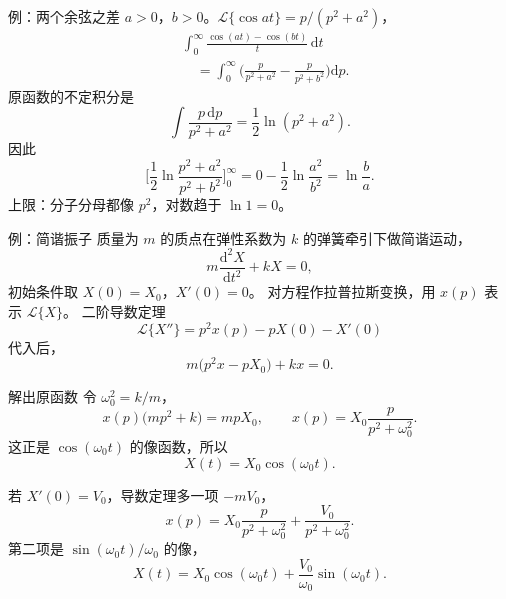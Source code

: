 \documentclass[fontset=windows, chinese, 10pt, xcolor=dvipsnames]{beamer}
\begin{document}
\begin{frame}{例：两个余弦之差}
  $a>0$，$b>0$。$\mathcal{L}\{\cos at\}=p/(p^2+a^2)$，
  \begin{align*}
    &\int_0^{\infty}\frac{\cos(at)-\cos(bt)}{t}\,\mathrm{d}t \\
    &\quad=\int_0^{\infty}
      \Biggl(\frac{p}{p^2+a^2}-\frac{p}{p^2+b^2}\Biggr)\mathrm{d}p.
  \end{align*}
  原函数的不定积分是
  \begin{equation*}
    \int\frac{p\,\mathrm{d}p}{p^2+a^2}=\frac12\ln(p^2+a^2).
  \end{equation*}
  因此
  \begin{equation*}
    \Biggl[\frac12\ln\frac{p^2+a^2}{p^2+b^2}\Biggr]_0^{\infty}
    =0-\frac12\ln\frac{a^2}{b^2}
    =\ln\frac{b}{a}.
  \end{equation*}
  上限：分子分母都像 $p^2$，对数趋于 $\ln 1=0$。
\end{frame}

\begin{frame}{例：简谐振子}
  质量为 $m$ 的质点在弹性系数为 $k$ 的弹簧牵引下做简谐运动，
  \begin{equation*}
    m\frac{\mathrm{d}^2 X}{\mathrm{d}t^2}+k X=0,
  \end{equation*}
  初始条件取 $X(0)=X_0$，$X'(0)=0$。
  对方程作拉普拉斯变换，用 $x(p)$ 表示 $\mathcal{L}\{X\}$。
  二阶导数定理
  \begin{equation*}
    \mathcal{L}\{X''\}=p^2 x(p)-p X(0)-X'(0)
  \end{equation*}
  代入后，
  \begin{equation*}
    m\bigl(p^2 x-p X_0\bigr)+k x=0.
  \end{equation*}
\end{frame}

\begin{frame}{解出原函数}
  令 $\omega_0^2=k/m$，
  \begin{equation*}
    x(p)\bigl(mp^2+k\bigr)=mp X_0,
    \qquad
    x(p)=X_0\frac{p}{p^2+\omega_0^2}.
  \end{equation*}
  这正是 $\cos(\omega_0 t)$ 的像函数，所以
  \begin{equation*}
    X(t)=X_0\cos(\omega_0 t).
  \end{equation*}
  \vspace{0.4em}

  若 $X'(0)=V_0$，导数定理多一项 $-m V_0$，
  \begin{equation*}
    x(p)=X_0\frac{p}{p^2+\omega_0^2}
        +\frac{V_0}{p^2+\omega_0^2}.
  \end{equation*}
  第二项是 $\sin(\omega_0 t)/\omega_0$ 的像，
  \begin{equation*}
    X(t)=X_0\cos(\omega_0 t)
         +\frac{V_0}{\omega_0}\sin(\omega_0 t).
  \end{equation*}
\end{frame}
\end{document}
